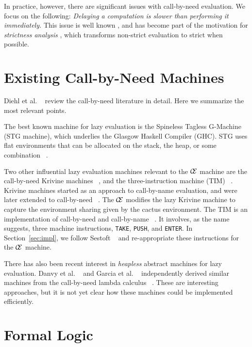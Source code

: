 In practice, however, there are significant issues with call-by-need evaluation.
We focus on the following: \emph{Delaying a computation is slower than
performing it immediately.} This issue is well known
\cite{johnsson1984efficient,jonesstg}, and has become part of the motivation
for \emph{strictness analysis}
\cite{mycroft1982abstract,wadler1987projections}, which transforms non-strict
evaluation to strict when possible.

\section{Existing Call-by-Need Machines}

Diehl et al. ~\cite{diehl2000abstract} review the call-by-need
literature in detail.  Here we summarize the most relevant points.

The best known machine for lazy evaluation is the Spineless Tagless
G-Machine (STG machine), which underlies the Glasgow Haskell Compiler (GHC). 
STG uses flat environments that can be allocated on the stack, the heap,
or some combination ~\cite{jonesstg}.  

Two other influential lazy evaluation machines relevant to the $\mathcal{\mathcal{C} \mskip -4mu \mathcal{E}}$
machine are the call-by-need Krivine machines
~\cite{lkm,krivine2007call,sestoft}, and the three-instruction machine (TIM)
~\cite{TIM}.  Krivine machines started as an approach to call-by-name
evaluation, and were later extended to call-by-need
~\cite{krivine2007call,sestoft,danvy2013synthetic,lkm}.  The $\mathcal{\mathcal{C} \mskip -4mu \mathcal{E}}$
modifies the lazy Krivine machine to capture the environment sharing given by
the cactus environment. The TIM is an implementation of call-by-need and
call-by-name ~\cite{TIM}.  It involves, as the name suggests, three machine
instructions, \texttt{TAKE}, \texttt{PUSH}, and \texttt{ENTER}. In
Section~\ref{sec:impl}, we follow Sestoft ~\cite{sestoft} and
re-appropriate these instructions for the $\mathcal{\mathcal{C} \mskip -4mu \mathcal{E}}$ machine.

There has also been recent interest in \emph{heapless} abstract
machines for lazy evaluation. Danvy et al. ~\cite{danvy2012inter} and
Garcia et al. ~\cite{garcia2009lazy} independently derived similar
machines from the call-by-need lambda calculus
~\cite{ariola1995call}. These are interesting approaches, but it is not yet
clear how these machines could be implemented efficiently.

\section{Formal Logic} \label{sec:background}

